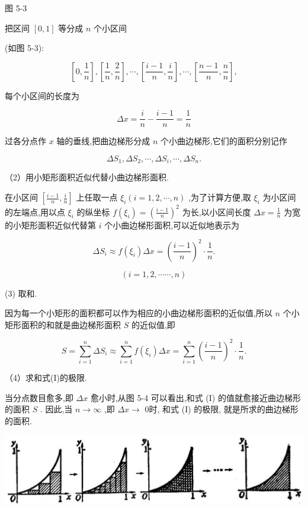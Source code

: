 \documentclass[10pt]{article}
\begin{document}
图 5-3

把区间 \(\left\lbrack {0,1}\right\rbrack\) 等分成 \(n\) 个小区间

(如图 5-3):

\[
\left\lbrack {0,\frac{1}{n}}\right\rbrack ,\left\lbrack {\frac{1}{n},\frac{2}{n}}\right\rbrack ,\cdots ,\left\lbrack {\frac{i - 1}{n},\frac{i}{n}}\right\rbrack ,\cdots ,\left\lbrack {\frac{n - 1}{n},\frac{n}{n}}\right\rbrack ,
\]

每个小区间的长度为

\[
{\Delta x} = \frac{i}{n} - \frac{i - 1}{n} = \frac{1}{n}
\]

过各分点作 \(x\) 轴的垂线,把曲边梯形分成 \(n\) 个小曲边梯形,它们的面积分别记作

\[
\Delta {S}_{1},\Delta {S}_{2},\cdots ,\Delta {S}_{i},\cdots ,\Delta {S}_{n}.
\]

（2）用小矩形面积近似代替小曲边梯形面积.

在小区间 \(\left\lbrack {\frac{i - 1}{n},\frac{i}{n}}\right\rbrack\) 上任取一点 \({\xi }_{i}\left( {i = 1,2,\cdots ,n}\right)\) ,为了计算方便,取 \({\xi }_{i}\) 为小区间的左端点,用以点 \({\xi }_{i}\) 的纵坐标 \(f\left( {\xi }_{i}\right) = {\left( \frac{i - 1}{n}\right) }^{2}\) 为长,以小区间长度 \({\Delta x} = \frac{1}{n}\) 为宽的小矩形面积近似代替第 \(i\) 个小曲边梯形面积,可以近似地表示为

\[
\Delta {S}_{i} \approx f\left( {\xi }_{i}\right) {\Delta x} = {\left( \frac{i - 1}{n}\right) }^{2} \cdot \frac{1}{n}.
\]

\[
\left( {i = 1,2,\cdots \cdots ,n}\right)
\]

(3) 取和.

因为每一个小矩形的面积都可以作为相应的小曲边梯形面积的近似值,所以 \(n\) 个小矩形面积的和就是曲边梯形面积 \(S\) 的近似值,即

\[
S = \mathop{\sum }\limits_{{i = 1}}^{n}\Delta {S}_{i} \approx \mathop{\sum }\limits_{{i = 1}}^{n}f\left( {\xi }_{i}\right) {\Delta x} = \mathop{\sum }\limits_{{i = 1}}^{n}{\left( \frac{i - 1}{n}\right) }^{2} \cdot \frac{1}{n}. \tag{I}
\]

（4）求和式(I)的极限.

当分点数目愈多,即 \({\Delta x}\) 愈小时,从图 5-4 可以看出,和式 (I) 的值就愈接近曲边梯形的面积 \(S\) . 因此,当 \(n \rightarrow \infty\) ,即 \({\Delta x} \rightarrow\) 0时, 和式 (I) 的极限, 就是所求的曲边梯形的面积.

\begin{center}
\includegraphics[max width=1.0\textwidth]{images/01912c18-5c3f-733d-b775-749ba9897a9d_218_835855.jpg}
\end{center}
\end{document}

